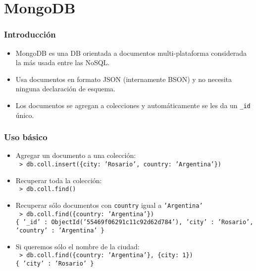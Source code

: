 \section{MongoDB}

\begin{frame}
\frametitle{Introducción}
\begin{itemize}

\item	MongoDB es una DB orientada a documentos multi-plataforma
	considerada la más usada entre las NoSQL.
	\pause

\item	Usa documentos en formato JSON (internamente BSON) y no necesita
	ninguna declaración de esquema.
	\pause

\item	Los documentos se agregan a colecciones y automáticamente se les
	da un \texttt{\_id} único.
\end{itemize}
\end{frame}

\begin{frame}
\frametitle{Uso básico}
\begin{itemize}

\item	Agregar un documento a una colección: \\
	\texttt{\footnotesize
		> db.coll.insert(\{city: 'Rosario', country: 'Argentina'\})
	}
	\pause

\item	Recuperar toda la colección: \\
	\texttt{\footnotesize
		> db.coll.find()
	}
	\pause

\item	Recuperar sólo documentos con \texttt{country} igual a
	\texttt{'Argentina'} \\
	\texttt{\footnotesize
		> db.coll.find(\{country: 'Argentina'\}) \\
		\{ '\_id' : ObjectId('55469f06291c11c92d62d784'), 'city' : 'Rosario', 'country' : 'Argentina' \}
	}
	\pause

\item	Si queremos sólo el nombre de la ciudad: \\
	\texttt{\footnotesize
		> db.coll.find(\{country: 'Argentina'\}, \{city: 1\}) \\
		\{ 'city' : 'Rosario' \}
	}

\end{itemize}
\end{frame}

